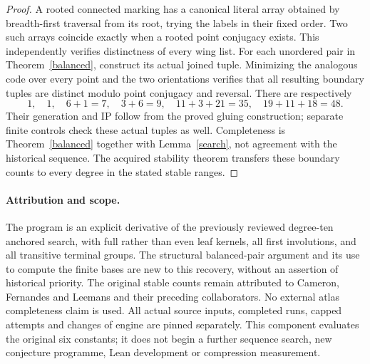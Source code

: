 \documentclass[11pt,a4paper]{article}
\begin{document}
\begin{proof}
A rooted connected marking has a canonical literal array obtained by
breadth-first traversal from its root, trying the labels in their fixed
order. Two such arrays coincide exactly when a rooted point conjugacy
exists. This independently verifies distinctness of every wing list.
For each unordered pair in Theorem~\ref{balanced}, construct its actual
joined tuple. Minimizing the analogous code over every point and the
two orientations verifies that all resulting boundary tuples are distinct
modulo point conjugacy and reversal. There are respectively
\[
 1,\quad 1,\quad 6+1=7,\quad 3+6=9,\quad
 11+3+21=35,\quad 19+11+18=48.
\]
Their generation and IP follow from the proved gluing construction;
separate finite controls check these actual tuples as well. Completeness
is Theorem~\ref{balanced} together with Lemma~\ref{search}, not agreement
with the historical sequence. The acquired stability theorem transfers
these boundary counts to every degree in the stated stable ranges.
\end{proof}

\paragraph{Attribution and scope.}
The program is an explicit derivative of the previously reviewed
degree-ten anchored search, with full rather than even leaf kernels,
all first involutions, and all transitive terminal groups. The structural
balanced-pair argument and its use to compute the finite bases are new
to this recovery, without an assertion of historical priority. The
original stable counts remain attributed to Cameron, Fernandes and
Leemans and their preceding collaborators. No external atlas completeness
claim is used. All actual source inputs, completed runs, capped attempts
and changes of engine are pinned separately. This component evaluates
the original six constants; it does not begin a further sequence search,
new conjecture programme, Lean development or compression measurement.
\end{document}

